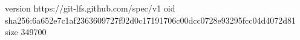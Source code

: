 version https://git-lfs.github.com/spec/v1
oid sha256:6a652e7c1af2363609727f92d0c17191706c00dcc0728e93295fcc04d4072d81
size 349700
